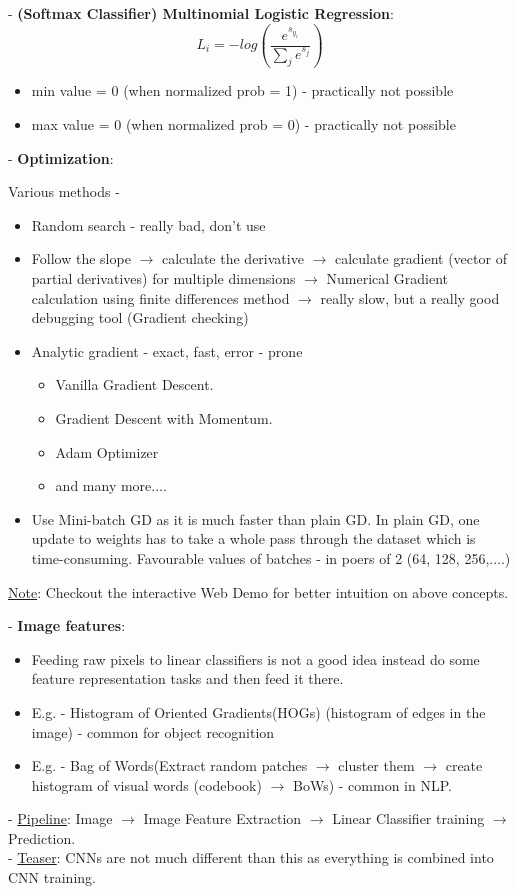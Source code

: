 \documentclass[twoside]{article}
\begin{document}
- \textbf {(Softmax Classifier) Multinomial Logistic Regression}:
\[
\displaystyle L_i = -log(\dfrac{e^{s_{y_i}}}{\sum_j e^{s_j}})
\]
\begin{itemize}
    \item min value = 0 (when normalized prob = 1) - practically not possible
    \item max value = 0 (when normalized prob = 0) - practically not possible
\end{itemize}

- \textbf{Optimization}:

Various methods - 

\begin{itemize}
    \item Random search - really bad, don't use
    \item Follow the slope $\rightarrow$ calculate the derivative $\rightarrow$ calculate gradient (vector of partial derivatives) for multiple dimensions $\rightarrow$ Numerical Gradient calculation using finite differences method $\rightarrow$ really slow, but a really good debugging tool (Gradient checking)
    \item Analytic gradient - exact, fast, error - prone
    \begin{itemize}
        \item Vanilla Gradient Descent.
        \item Gradient Descent with Momentum.
        \item Adam Optimizer
        \item and many more....
    \end{itemize}
    \item Use Mini-batch GD as it is much faster than plain GD. In plain GD, one update to weights has to take a whole pass through the dataset which is time-consuming. Favourable values of batches - in poers of 2 (64, 128, 256,....)
\end{itemize}

\underline{Note}: Checkout the interactive Web Demo for better intuition on above concepts.

- \textbf{Image features}:
\begin{itemize}
    \item Feeding raw pixels to linear classifiers is not a good idea instead do some feature representation tasks and then feed it there.
    \item E.g. - Histogram of Oriented Gradients(HOGs) (histogram of edges in the image) - common for object recognition
    \item E.g. - Bag of Words(Extract random patches $\rightarrow$ cluster them $\rightarrow$ create histogram of visual words (codebook) $\rightarrow$ BoWs) - common in NLP.
\end{itemize}

- \underline{Pipeline}: Image $\rightarrow$ Image Feature Extraction $\rightarrow$ Linear Classifier training $\rightarrow$ Prediction. 
\\

- \underline{Teaser}: CNNs are not much different than this as everything is combined into CNN training.

\end{document}
